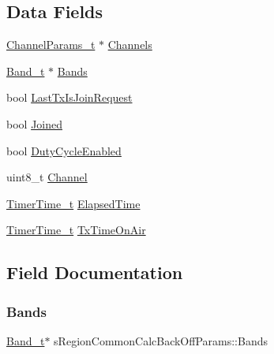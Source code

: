 \subsection*{Data Fields}
\begin{DoxyCompactItemize}
\item 
\hyperlink{group__LORAMAC_ga1360ca6f82c6d125ea43a9dad9b56184}{Channel\+Params\+\_\+t} $\ast$ \hyperlink{structsRegionCommonCalcBackOffParams_a80b7872d31b72001cd95966a368d7b03}{Channels}
\item 
\hyperlink{group__LORAMAC_ga8f49721ee96ceb52c80a896ab11a2ed8}{Band\+\_\+t} $\ast$ \hyperlink{structsRegionCommonCalcBackOffParams_a08398c203c36396709386edc3c354b92}{Bands}
\item 
bool \hyperlink{structsRegionCommonCalcBackOffParams_aafd7bf9a24adbed2a88aa1334e30e528}{Last\+Tx\+Is\+Join\+Request}
\item 
bool \hyperlink{structsRegionCommonCalcBackOffParams_a744476f15b6a603ba729a942b9d6fcdc}{Joined}
\item 
bool \hyperlink{structsRegionCommonCalcBackOffParams_a3a4e746118e3f72abfc8dd5dc7ac533b}{Duty\+Cycle\+Enabled}
\item 
uint8\+\_\+t \hyperlink{structsRegionCommonCalcBackOffParams_a05928beb5ca2ff12d429f389def16532}{Channel}
\item 
\hyperlink{utilities_8h_a4215ca43d3e953099ea758ce428599d0}{Timer\+Time\+\_\+t} \hyperlink{structsRegionCommonCalcBackOffParams_aa8267b93bd66be0a05ca2ee14fa6c7bb}{Elapsed\+Time}
\item 
\hyperlink{utilities_8h_a4215ca43d3e953099ea758ce428599d0}{Timer\+Time\+\_\+t} \hyperlink{structsRegionCommonCalcBackOffParams_a24e06077cbe6b16d8abd08ef6327a4dc}{Tx\+Time\+On\+Air}
\end{DoxyCompactItemize}


\subsection{Field Documentation}
\mbox{\label{structsRegionCommonCalcBackOffParams_a08398c203c36396709386edc3c354b92}} 
\subsubsection{\texorpdfstring{Bands}{Bands}}
{\footnotesize\ttfamily \hyperlink{group__LORAMAC_ga8f49721ee96ceb52c80a896ab11a2ed8}{Band\+\_\+t}$\ast$ s\+Region\+Common\+Calc\+Back\+Off\+Params\+::\+Bands}

